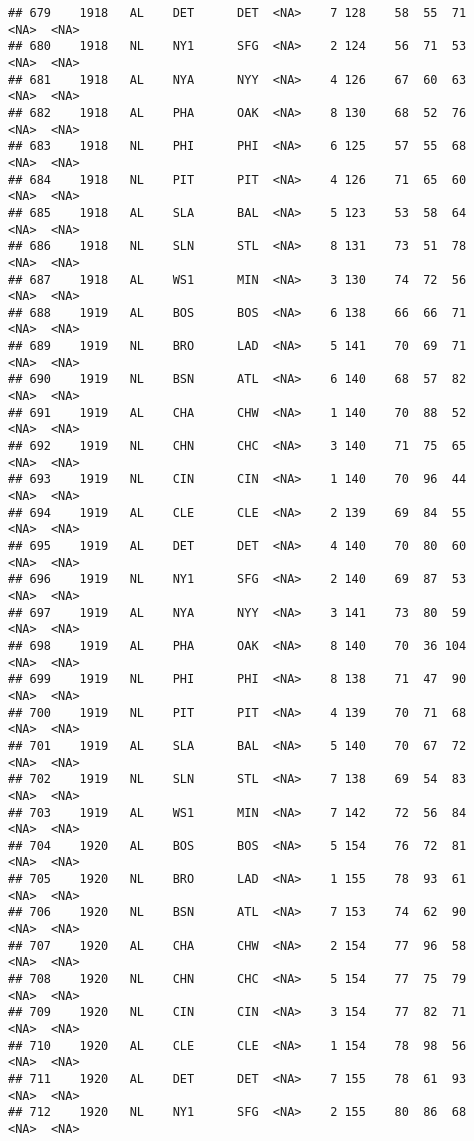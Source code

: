 \documentclass[]{article}
\begin{document}
\begin{verbatim}
## 679    1918   AL    DET      DET  <NA>    7 128    58  55  71   <NA>  <NA>
## 680    1918   NL    NY1      SFG  <NA>    2 124    56  71  53   <NA>  <NA>
## 681    1918   AL    NYA      NYY  <NA>    4 126    67  60  63   <NA>  <NA>
## 682    1918   AL    PHA      OAK  <NA>    8 130    68  52  76   <NA>  <NA>
## 683    1918   NL    PHI      PHI  <NA>    6 125    57  55  68   <NA>  <NA>
## 684    1918   NL    PIT      PIT  <NA>    4 126    71  65  60   <NA>  <NA>
## 685    1918   AL    SLA      BAL  <NA>    5 123    53  58  64   <NA>  <NA>
## 686    1918   NL    SLN      STL  <NA>    8 131    73  51  78   <NA>  <NA>
## 687    1918   AL    WS1      MIN  <NA>    3 130    74  72  56   <NA>  <NA>
## 688    1919   AL    BOS      BOS  <NA>    6 138    66  66  71   <NA>  <NA>
## 689    1919   NL    BRO      LAD  <NA>    5 141    70  69  71   <NA>  <NA>
## 690    1919   NL    BSN      ATL  <NA>    6 140    68  57  82   <NA>  <NA>
## 691    1919   AL    CHA      CHW  <NA>    1 140    70  88  52   <NA>  <NA>
## 692    1919   NL    CHN      CHC  <NA>    3 140    71  75  65   <NA>  <NA>
## 693    1919   NL    CIN      CIN  <NA>    1 140    70  96  44   <NA>  <NA>
## 694    1919   AL    CLE      CLE  <NA>    2 139    69  84  55   <NA>  <NA>
## 695    1919   AL    DET      DET  <NA>    4 140    70  80  60   <NA>  <NA>
## 696    1919   NL    NY1      SFG  <NA>    2 140    69  87  53   <NA>  <NA>
## 697    1919   AL    NYA      NYY  <NA>    3 141    73  80  59   <NA>  <NA>
## 698    1919   AL    PHA      OAK  <NA>    8 140    70  36 104   <NA>  <NA>
## 699    1919   NL    PHI      PHI  <NA>    8 138    71  47  90   <NA>  <NA>
## 700    1919   NL    PIT      PIT  <NA>    4 139    70  71  68   <NA>  <NA>
## 701    1919   AL    SLA      BAL  <NA>    5 140    70  67  72   <NA>  <NA>
## 702    1919   NL    SLN      STL  <NA>    7 138    69  54  83   <NA>  <NA>
## 703    1919   AL    WS1      MIN  <NA>    7 142    72  56  84   <NA>  <NA>
## 704    1920   AL    BOS      BOS  <NA>    5 154    76  72  81   <NA>  <NA>
## 705    1920   NL    BRO      LAD  <NA>    1 155    78  93  61   <NA>  <NA>
## 706    1920   NL    BSN      ATL  <NA>    7 153    74  62  90   <NA>  <NA>
## 707    1920   AL    CHA      CHW  <NA>    2 154    77  96  58   <NA>  <NA>
## 708    1920   NL    CHN      CHC  <NA>    5 154    77  75  79   <NA>  <NA>
## 709    1920   NL    CIN      CIN  <NA>    3 154    77  82  71   <NA>  <NA>
## 710    1920   AL    CLE      CLE  <NA>    1 154    78  98  56   <NA>  <NA>
## 711    1920   AL    DET      DET  <NA>    7 155    78  61  93   <NA>  <NA>
## 712    1920   NL    NY1      SFG  <NA>    2 155    80  86  68   <NA>  <NA>

\end{verbatim}
\end{document}
